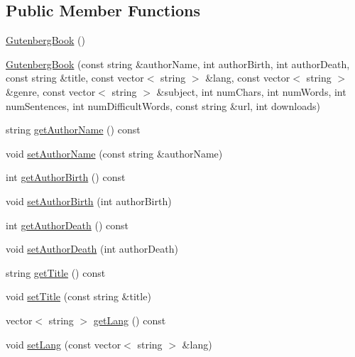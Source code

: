 \subsection*{Public Member Functions}
\begin{DoxyCompactItemize}
\item 
\mbox{\hyperlink{classbridges_1_1dataset_1_1_gutenberg_book_ab88639acb3d28345f1db063d603f1123}{Gutenberg\+Book}} ()
\item 
\mbox{\hyperlink{classbridges_1_1dataset_1_1_gutenberg_book_abe1720623c08625c3e8760830d6c1aa0}{Gutenberg\+Book}} (const string \&author\+Name, int author\+Birth, int author\+Death, const string \&title, const vector$<$ string $>$ \&lang, const vector$<$ string $>$ \&genre, const vector$<$ string $>$ \&subject, int num\+Chars, int num\+Words, int num\+Sentences, int num\+Difficult\+Words, const string \&url, int downloads)
\item 
string \mbox{\hyperlink{classbridges_1_1dataset_1_1_gutenberg_book_af5d7264fa6bacf1e22e32597b56cf9ba}{get\+Author\+Name}} () const
\item 
void \mbox{\hyperlink{classbridges_1_1dataset_1_1_gutenberg_book_a09215f3b16398ecd44601d02783a3d31}{set\+Author\+Name}} (const string \&author\+Name)
\item 
int \mbox{\hyperlink{classbridges_1_1dataset_1_1_gutenberg_book_af79cc9c9e3ef58bf3a46f9b1f463ff21}{get\+Author\+Birth}} () const
\item 
void \mbox{\hyperlink{classbridges_1_1dataset_1_1_gutenberg_book_a3e1f467ffdd47e558d4b4f4c83f2e620}{set\+Author\+Birth}} (int author\+Birth)
\item 
int \mbox{\hyperlink{classbridges_1_1dataset_1_1_gutenberg_book_a658fe236dd9a6f8da0ce7bf6c074c144}{get\+Author\+Death}} () const
\item 
void \mbox{\hyperlink{classbridges_1_1dataset_1_1_gutenberg_book_a938d0e579e5d2b2c0c62a6ea22317223}{set\+Author\+Death}} (int author\+Death)
\item 
string \mbox{\hyperlink{classbridges_1_1dataset_1_1_gutenberg_book_a40fe78ea917df1212d1918da4dcfeb7a}{get\+Title}} () const
\item 
void \mbox{\hyperlink{classbridges_1_1dataset_1_1_gutenberg_book_a92b2299297a63bb95cb32edb236c29cd}{set\+Title}} (const string \&title)
\item 
vector$<$ string $>$ \mbox{\hyperlink{classbridges_1_1dataset_1_1_gutenberg_book_a6e131887b78b9741f410cd022e11af19}{get\+Lang}} () const
\item 
void \mbox{\hyperlink{classbridges_1_1dataset_1_1_gutenberg_book_aef718f3309b4959b04b7f8cc3e8f887e}{set\+Lang}} (const vector$<$ string $>$ \&lang)

\end{DoxyCompactItemize}
